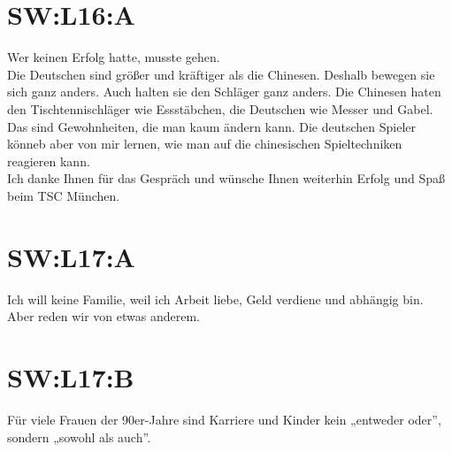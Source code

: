 \section{SW:L16:A}
Wer keinen Erfolg hatte, musste gehen. \\
Die Deutschen sind größer und kräftiger als die Chinesen. Deshalb bewegen sie sich ganz anders. 
Auch halten sie den Schläger ganz anders.
Die Chinesen haten den Tischtennischläger wie Essstäbchen,
die Deutschen wie Messer und Gabel.
Das sind Gewohnheiten, die man kaum ändern kann. 
Die deutschen Spieler könneb aber von mir lernen, wie man auf die chinesischen Spieltechniken reagieren kann. \\
Ich danke Ihnen für das Gespräch und wünsche Ihnen weiterhin Erfolg und Spaß beim TSC München. 

\section{SW:L17:A}
Ich will keine Familie, weil ich Arbeit liebe, Geld verdiene und abhängig bin. \\
Aber reden wir von etwas anderem.  \\

\section{SW:L17:B}
Für viele Frauen der 90er-Jahre  sind Karriere und Kinder kein „entweder oder”, sondern „sowohl als auch”.  \\

